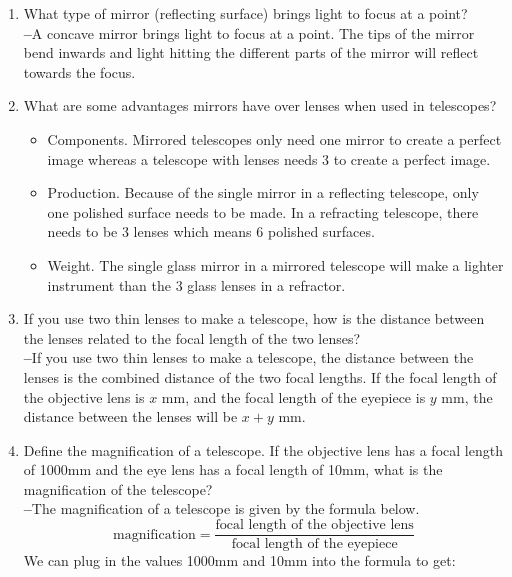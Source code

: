 \documentclass[12pt]{article}
\newcommand\mk{\textbf{--}}
\begin{document}
\begin{enumerate}
        \item What type of mirror (reflecting surface) brings light to focus at a point?\\
            \mk{}A concave mirror brings light to focus at a point. The tips of the mirror bend inwards and light hitting the different parts of the mirror will reflect towards the focus.
        \item What are some advantages mirrors have over lenses when used in telescopes?\\
            \begin{itemize}
                \item Components. Mirrored telescopes only need one mirror to create a perfect image whereas a telescope with lenses needs 3 to create a perfect image.
                \item Production. Because of the single mirror in a reflecting telescope, only one polished surface needs to be made. In a refracting telescope, there needs to be 3 lenses which means 6 polished surfaces.
                \item Weight. The single glass mirror in a mirrored telescope will make a lighter instrument than the 3 glass lenses in a refractor. 
            \end{itemize}
        \item If you use two thin lenses to make a telescope, how is the distance between the lenses related to the focal length of the two lenses?\\
            \mk{}If you use two thin lenses to make a telescope, the distance between the lenses is the combined distance of the two focal lengths. If the focal length of the objective lens is $x$ mm, and the focal length of the eyepiece is $y$ mm, the distance between the lenses will be $x + y$ mm.
        \item Define the magnification of a telescope. If the objective lens has a focal length of 1000mm and the eye lens has a focal length of 10mm, what is the magnification of the telescope?\\
            \mk{}The magnification of a telescope is given by the formula below. 
            \begin{equation*}
                \text{magnification} = \frac{\text{focal length of the objective lens}}{\text{focal length of the eyepiece}}
            \end{equation*}
            We can plug in the values 1000mm and 10mm into the formula to get:
            \begin{equation*}

\end{equation*}
\end{enumerate}
\end{document}
